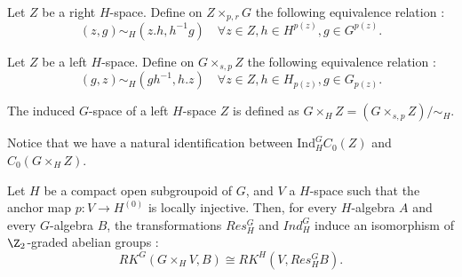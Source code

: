 Let $Z$ be a right $H$-space. Define on $Z\times_{p,r} G$ the following equivalence relation :
\[(z,g)\sim_H (z.h, h^{-1}g)\quad \forall z\in Z, h\in H^{p(z)},g\in G^{p(z)}.\]

Let $Z$ be a left $H$-space. Define on $G \times_{s,p} Z $ the following equivalence relation :
\[(g,z)\sim_H (gh^{-1}, h.z)\quad \forall z\in Z, h\in H_{p(z)},g\in G_{p(z)}.\]

\begin{definition}
The induced $G$-space of a left $H$-space $Z$ is defined as $ G\times_H Z = (G \times_{s,p} Z) / \sim_H$. 
\end{definition}

Notice that we have a natural identification between $\text{Ind}_H^G C_0(Z)$ and $C_0(G \times_H Z)$.\\

\begin{lem} \label{Restriction} Let $H$ be a compact open subgroupoid of $G$, and $V$ a $H$-space such that the anchor map $p : V\rightarrow H^{(0)}$ is locally injective. Then, for every $H$-algebra $A$ and every $G$-algebra $B$, the transformations $Res_H^G$ and $Ind_H^G$ induce an isomorphism of $\Z_2$-graded abelian groups :
\[RK^G( G\times_H V, B) \cong RK^H(V, Res_H^G B).\]
\end{lem}



